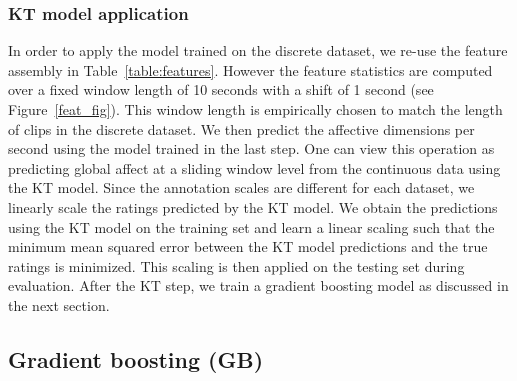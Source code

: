 \documentclass{article}
\begin{document}
\subsubsection{KT model application}
In order to apply the model trained on the discrete dataset, we re-use the feature assembly in Table~\ref{table:features}.
However the feature statistics are computed over a fixed window length of 10 seconds with a shift of 1 second (see Figure~\ref{feat_fig}). 
This window length is empirically chosen to match the length of clips in the discrete dataset. 
We then predict the affective dimensions per second using the model trained in the last step.
One can view this operation as predicting global affect at a sliding window level from the continuous data using the KT model.
Since the annotation scales are different for each dataset, we linearly scale the ratings predicted by the KT model.
We obtain the predictions using the KT model on the training set and learn a linear scaling such that the minimum mean squared error between the KT model predictions and the true ratings is minimized.
This scaling is then applied on the testing set during evaluation. 
After the KT step, we train a gradient boosting model as discussed in the next section. 


\subsection{Gradient boosting (GB)}
\end{document}
